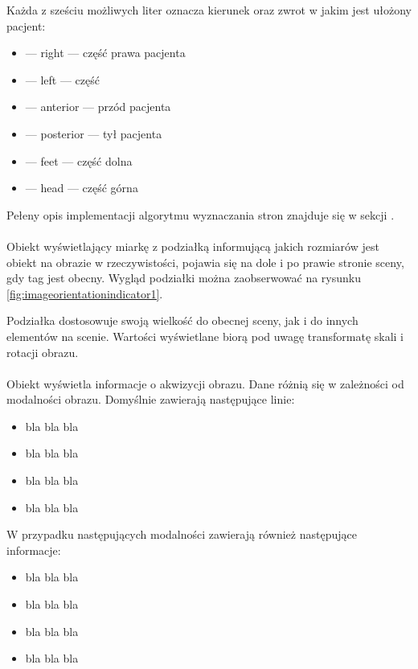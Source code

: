 \par
Każda z sześciu możliwych liter oznacza kierunek oraz zwrot w jakim jest ułożony pacjent:
\begin{itemize}
    \item {} --- right --- część prawa pacjenta
    \item {} --- left --- część
    \item {} --- anterior --- przód pacjenta
    \item {} --- posterior --- tył pacjenta
    \item {} --- feet --- część dolna
    \item {} --- head --- część górna
\end{itemize}

\par
Pełeny opis implementacji algorytmu wyznaczania stron znajduje się w sekcji \label{sec:algorithm-imageorientationindicator}.

\paragraph{}

Obiekt wyświetlający miarkę z podziałką informującą jakich rozmiarów jest obiekt na obrazie w rzeczywistości, pojawia się na dole i po prawie stronie sceny, gdy tag  jest obecny.
Wygląd podziałki można zaobserwować na rysunku \ref{fig:imageorientationindicator1}.

Podziałka dostosowuje swoją wielkość do obecnej sceny, jak i do innych elementów na scenie.
Wartości wyświetlane biorą pod uwagę transformatę skali i rotacji obrazu.

\paragraph{}

Obiekt wyświetla informacje o akwizycji obrazu.
Dane różnią się w zależności od modalności obrazu.
Domyślnie zawierają następujące linie:
\begin{itemize}
    \item bla bla bla
    \item bla bla bla
    \item bla bla bla
    \item bla bla bla
\end{itemize}

W przypadku następujących modalności zawierają również następujące informacje:
\begin{itemize}
    \item bla bla bla
    \item bla bla bla
    \item bla bla bla
    \item bla bla bla
\end{itemize}